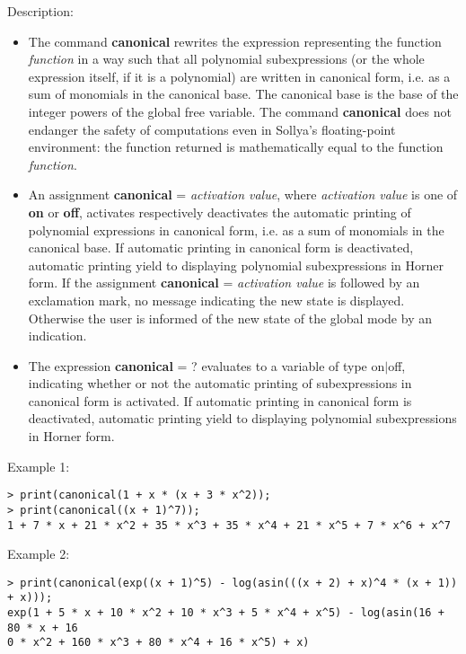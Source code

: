 \noindent Description: \begin{itemize}

\item The command \textbf{canonical} rewrites the expression representing the function
   \emph{function} in a way such that all polynomial subexpressions (or the
   whole expression itself, if it is a polynomial) are written in
   canonical form, i.e. as a sum of monomials in the canonical base. The
   canonical base is the base of the integer powers of the global free
   variable. The command \textbf{canonical} does not endanger the safety of
   computations even in Sollya's floating-point environment: the
   function returned is mathematically equal to the function \emph{function}.

\item An assignment \textbf{canonical} = \emph{activation value}, where \emph{activation value}
   is one of \textbf{on} or \textbf{off}, activates respectively deactivates the
   automatic printing of polynomial expressions in canonical form,
   i.e. as a sum of monomials in the canonical base. If automatic
   printing in canonical form is deactivated, automatic printing yield to
   displaying polynomial subexpressions in Horner form.
   If the assignment \textbf{canonical} = \emph{activation value} is followed by an
   exclamation mark, no message indicating the new state is
   displayed. Otherwise the user is informed of the new state of the
   global mode by an indication.

\item The expression \textbf{canonical} = ? evaluates to a variable of type
   \textsf{on$|$off}, indicating whether or not the automatic printing of
   subexpressions in canonical form is activated. If automatic printing
   in canonical form is deactivated, automatic printing yield to
   displaying polynomial subexpressions in Horner form.
\end{itemize}
\noindent Example 1: 
\begin{center}\begin{minipage}{15cm}\begin{Verbatim}[frame=single]
> print(canonical(1 + x * (x + 3 * x^2));
> print(canonical((x + 1)^7));
1 + 7 * x + 21 * x^2 + 35 * x^3 + 35 * x^4 + 21 * x^5 + 7 * x^6 + x^7
\end{Verbatim}
\end{minipage}\end{center}
\noindent Example 2: 
\begin{center}\begin{minipage}{15cm}\begin{Verbatim}[frame=single]
> print(canonical(exp((x + 1)^5) - log(asin(((x + 2) + x)^4 * (x + 1)) + x)));
exp(1 + 5 * x + 10 * x^2 + 10 * x^3 + 5 * x^4 + x^5) - log(asin(16 + 80 * x + 16
0 * x^2 + 160 * x^3 + 80 * x^4 + 16 * x^5) + x)
\end{Verbatim}
\end{minipage}\end{center}
